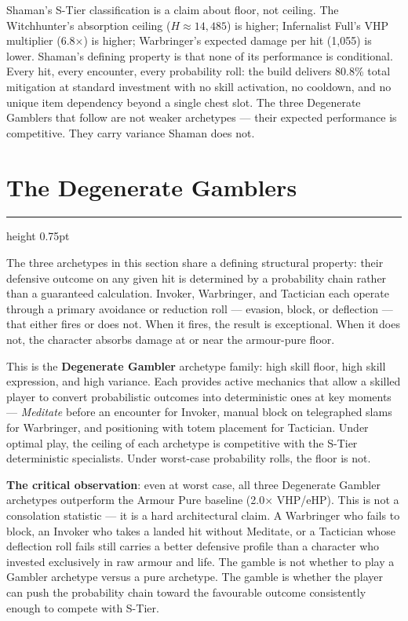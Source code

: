 \documentclass[12pt, letterpaper]{article}
\begin{document}
Shaman's S-Tier classification is a claim about floor, not ceiling. The Witchhunter's absorption ceiling ($H \approx 14{,}485$) is higher; Infernalist Full's VHP multiplier (6.8$\times$) is higher; Warbringer's expected damage per hit (1{,}055) is lower. Shaman's defining property is that none of its performance is conditional. Every hit, every encounter, every probability roll: the build delivers 80.8\% total mitigation at standard investment with no skill activation, no cooldown, and no unique item dependency beyond a single chest slot. The three Degenerate Gamblers that follow are not weaker archetypes --- their expected performance is competitive. They carry variance Shaman does not.

\newpage
\section*{The Degenerate Gamblers}
\hrule height 0.75pt
\vspace{6pt}

The three archetypes in this section share a defining structural property: their defensive outcome on any given hit is determined by a probability chain rather than a guaranteed calculation. Invoker, Warbringer, and Tactician each operate through a primary avoidance or reduction roll --- evasion, block, or deflection --- that either fires or does not. When it fires, the result is exceptional. When it does not, the character absorbs damage at or near the armour-pure floor.

This is the \textbf{Degenerate Gambler} archetype family: high skill floor, high skill expression, and high variance. Each provides active mechanics that allow a skilled player to convert probabilistic outcomes into deterministic ones at key moments --- \textit{Meditate} before an encounter for Invoker, manual block on telegraphed slams for Warbringer, and positioning with totem placement for Tactician. Under optimal play, the ceiling of each archetype is competitive with the S-Tier deterministic specialists. Under worst-case probability rolls, the floor is not.

\textbf{The critical observation}: even at worst case, all three Degenerate Gambler archetypes outperform the Armour Pure baseline (2.0$\times$ VHP/eHP). This is not a consolation statistic --- it is a hard architectural claim. A Warbringer who fails to block, an Invoker who takes a landed hit without Meditate, or a Tactician whose deflection roll fails still carries a better defensive profile than a character who invested exclusively in raw armour and life. The gamble is not whether to play a Gambler archetype versus a pure archetype. The gamble is whether the player can push the probability chain toward the favourable outcome consistently enough to compete with S-Tier.
\end{document}
